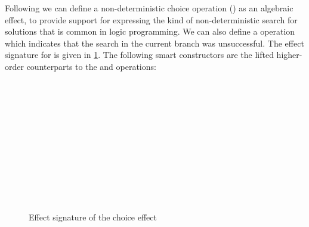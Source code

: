 Following \citet{DBLP:conf/ppdp/SchrijversWDD14,WuSH14,YangPWBS22} we can define a non-deterministic choice operation () as an algebraic effect, to provide support for expressing the kind of non-deterministic search for solutions that is common in logic programming.
We can also define a  operation which indicates that the search in the current branch was unsuccessful.
The effect signature for  is given in \cref{fig:choice-sig}.
The following smart constructors are the lifted higher-order counterparts to the  and  operations:
\begin{code}[hide]%
\>[0][@{}l@{\AgdaIndent{1}}]%
\>[2]\AgdaSpace{}%
\AgdaSpace{}%
\<%
\\
\>[2][@{}l@{\AgdaIndent{0}}]%
\>[4]\AgdaSpace{}%
\<%
\\
%
\>[4]\AgdaSpace{}%
\<%
\\
%
\>[4]\AgdaSpace{}%
\<%
\\
\>[0]\<%
\end{code}
\begin{figure}
\begin{minipage}{0.495\linewidth}
\begin{code}%
\>[0][@{}l@{\AgdaIndent{1}}]%
\>[4]\AgdaSpace{}%
\AgdaSpace{}%
\AgdaSymbol{:}\AgdaSpace{}%
\AgdaSpace{}%
\<%
\\
\>[4][@{}l@{\AgdaIndent{0}}]%
\>[6]%
\>[12]\AgdaSymbol{:}\AgdaSpace{}%
\<%
\\
%
\>[6]%
\>[12]\AgdaSymbol{:}\AgdaSpace{}%
\<%
\end{code}
  \end{minipage}
  \hfill\vline\hfill
  \begin{minipage}{0.495\linewidth}
\begin{code}%
%
\>[4]\AgdaSpace{}%
\AgdaSymbol{:}\AgdaSpace{}%
\<%
\\
%
\>[4]%
\>[8]\AgdaSpace{}%
\AgdaSymbol{=}\AgdaSpace{}%
\<%
\\
%
\>[4]\AgdaSpace{}%
\AgdaSpace{}%
\AgdaSpace{}%
\AgdaSymbol{=}\AgdaSpace{}%
\<%
\\
%
\>[4]\AgdaSpace{}%
\AgdaSpace{}%
\AgdaSpace{}%
\AgdaSymbol{=}\AgdaSpace{}%
\<%
\end{code}
\end{minipage}
\caption{Effect signature of the choice effect}
\label{fig:choice-sig}
\end{figure}
